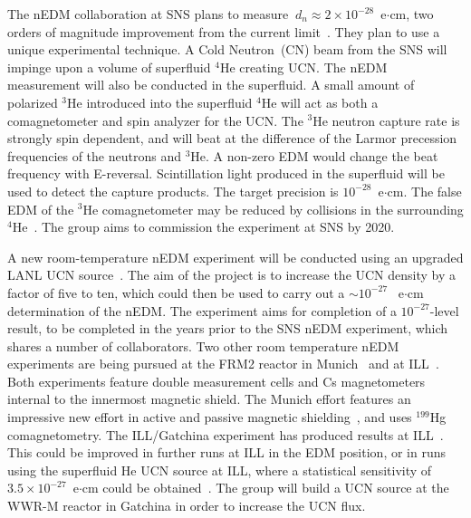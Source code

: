 The nEDM collaboration at SNS plans to measure
$\ d_n\approx 2 \times 10^{-28} $~e$\cdot$cm, two orders of magnitude
improvement from the current limit~\cite{peng2008neutron}.  They plan
to use a unique experimental technique. A Cold Neutron~(CN) beam from
the SNS will impinge upon a volume of superfluid $^4$He creating
UCN. The nEDM measurement will also be conducted in the superfluid. A
small amount of polarized $^3$He introduced into the superfluid $^4$He
will act as both a comagnetometer and spin analyzer for the UCN. The
$^3$He neutron capture rate is strongly spin dependent, and will beat
at the difference of the Larmor precession frequencies of the neutrons
and $^3$He. A non-zero EDM would change the beat frequency with
E-reversal. Scintillation light produced in the superfluid will be
used to detect the capture products. The target precision is
$10^{-28}$~e$\cdot$cm. The false EDM of the $^3$He comagnetometer may
be reduced by collisions in the surrounding
$^4$He~\cite{LamGol2005}. The group aims to commission the experiment
at SNS by 2020.


A new room-temperature nEDM experiment will be conducted using an
upgraded LANL UCN source~\cite{Steven_talk}. The aim of the project is
to increase the UCN density by a factor of five to ten, which could
then be used to carry out a $\sim 10^{-27}$~ e$\cdot$cm determination
of the nEDM.  The experiment aims for completion of a $10^{-27}$-level
result, to be completed in the years prior to the SNS nEDM experiment,
which shares a number of collaborators.  Two other room temperature
nEDM experiments are being pursued at the FRM2 reactor in
Munich~\cite{altarev2012} and at ILL~\cite{Serebrov2015}. Both
experiments feature double measurement cells and Cs magnetometers
internal to the innermost magnetic shield. The Munich effort features
an impressive new effort in active and passive magnetic
shielding~\cite{altarev2014magnetically,
  altarev2015large,altarev2015minimizing,altarev2012next}, and uses
$^{199}$Hg comagnetometry. The ILL/Gatchina experiment has produced
results at ILL~\cite{Serebrov2015}. This could be improved in further
runs at ILL in the EDM position, or in runs using the superfluid He
UCN source at ILL, where a statistical sensitivity of
$3.5 \times 10^{-27}$~e$\cdot$cm could be
obtained~\cite{Serebrov_talk}. The group will build a UCN source at
the WWR-M reactor in Gatchina in order to increase the UCN flux.




















